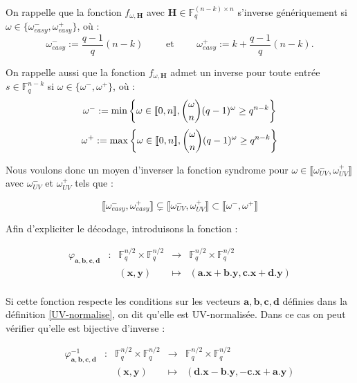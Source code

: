 \documentclass[12pt]{article}
\theoremstyle{plain}
\newcommand{\F}{\mathbb{F}}
\begin{document}
\noindent On rappelle que la fonction $f_{\omega,\mathbf{H}}$ avec $\mathbf{H} \in \F_q^{(n-k)\times n}$ s'inverse génériquement si $\omega \in \{\omega_{easy}^-,\omega_{easy}^+\}$, où :
$$ \omega_{easy}^- := \frac{q-1}{q}(n-k) \qquad \text{ et }\qquad  \omega_{easy}^+ := k + \frac{q-1}{q}(n-k).$$




\noindent On rappelle aussi que la fonction $f_{\omega,\mathbf{H}}$ admet un inverse pour toute entrée $s \in \F_q^{n-k}$ si $\omega \in \{\omega^-,\omega^+\}$, où :
$$\omega^- := \min\left\{\omega\in \llbracket0,n\rrbracket , \dbinom{\omega}{n}(q-1)^{\omega} \geq q^{n-k}\right\} $$
$$\omega^+ := \max\left\{\omega\in \llbracket0,n\rrbracket , \dbinom{\omega}{n}(q-1)^{\omega} \geq q^{n-k}\right\}$$


\noindent Nous voulons donc un moyen d'inverser la fonction syndrome pour $\omega \in \llbracket\omega_{UV}^-,\omega_{UV}^+\rrbracket$ avec $\omega_{UV}^-$ et $\omega_{UV}^+$ tels que :

$$\llbracket\omega_{easy}^-,\omega_{easy}^+\rrbracket \subsetneq \llbracket\omega_{UV}^-,\omega_{UV}^+\rrbracket \subset  \llbracket\omega^-,\omega^+\rrbracket$$


\noindent Afin d'expliciter le décodage, introduisons la fonction :

$$\begin{array}{ccccc}
\varphi_{\mathbf{a},\mathbf{b},\mathbf{c},\mathbf{d}} & : & \F_q^{n/2} \times  \F_q^{n/2} & \to & \F_q^{n/2} \times  \F_q^{n/2} \\
 & & (\mathbf{x} , \mathbf{y}) & \mapsto &  (\mathbf{a}.\mathbf{x} + \mathbf{b}.\mathbf{y}, \mathbf{c}.\mathbf{x} + \mathbf{d}.\mathbf{y}) \\
\end{array}$$

\noindent Si cette fonction respecte les conditions sur les vecteurs $\mathbf{a},\mathbf{b},\mathbf{c},\mathbf{d}$ définies dans la définition \ref{UV-normalise}, on dit qu'elle est UV-normalisée. Dans ce cas on peut vérifier qu'elle est bijective d'inverse :

$$\begin{array}{ccccc}
\varphi^{-1}_{\mathbf{a},\mathbf{b},\mathbf{c},\mathbf{d}} & : & \F_q^{n/2} \times  \F_q^{n/2} & \to & \F_q^{n/2} \times  \F_q^{n/2} \\
 & & (\mathbf{x} , \mathbf{y}) & \mapsto &  (\mathbf{d}.\mathbf{x} - \mathbf{b}.\mathbf{y}, -\mathbf{c}.\mathbf{x} + \mathbf{a}.\mathbf{y}) \\
\end{array}$$
\end{document}
